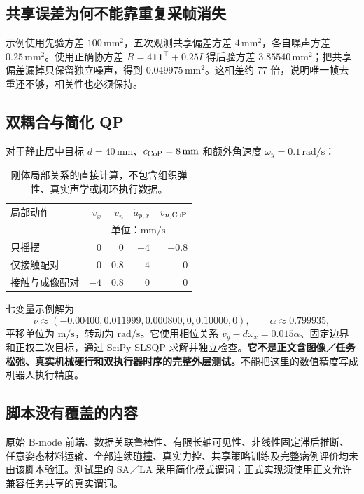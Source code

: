 \documentclass[UTF8,11pt,a4paper,fontset=fandol]{ctexart}
\numberwithin{equation}{section}
\theoremstyle{definition}
\begin{document}
\subsection{共享误差为何不能靠重复采帧消失}
示例使用先验方差 $100\,\mathrm{mm^2}$，五次观测共享偏差方差 $4\,\mathrm{mm^2}$，各自噪声方差 $0.25\,\mathrm{mm^2}$。使用正确协方差 $R=4\mathbf1\mathbf1^\top+0.25I$ 得后验方差 $3.85540\,\mathrm{mm^2}$；把共享偏差漏掉只保留独立噪声，得到 $0.049975\,\mathrm{mm^2}$。这相差约 77 倍，说明唯一帧去重还不够，相关性也必须保持。

\subsection{双耦合与简化 QP}
对于静止居中目标 $d=40\,\mathrm{mm}$、$c_{\rm CoP}=8\,\mathrm{mm}$ 和额外角速度 $\omega_y=0.1\,\mathrm{rad/s}$：
\begin{table}[htbp]\centering\small
\begin{tabular}{lrrrr}
\toprule
局部动作 & $v_x$ & $v_n$ & $\dot a_{p,x}$ & $v_{n,\rm CoP}$\\
 & \multicolumn{4}{c}{单位：$\mathrm{mm/s}$}\\\midrule
只摇摆 & 0 & 0 & $-4$ & $-0.8$\\
仅接触配对 & 0 & $0.8$ & $-4$ & 0\\
接触与成像配对 & $-4$ & $0.8$ & 0 & 0\\\bottomrule
\end{tabular}
\caption{刚体局部关系的直接计算，不包含组织弹性、真实声学或闭环执行数据。}
\end{table}

七变量示例解为
\begin{equation}
\nu\approx(-0.00400,0.011999,0.000800,0,0.10000,0),\qquad
\alpha\approx0.799935,
\end{equation}
平移单位为 $\mathrm{m/s}$，转动为 $\mathrm{rad/s}$。它使用相位关系 $v_y-d\omega_x=0.015\alpha$、固定边界和正权二次目标，通过 SciPy SLSQP 求解并独立检查。\textbf{它不是正文含图像／任务松弛、真实机械硬行和双执行器时序的完整外层测试。}不能把这里的数值精度写成机器人执行精度。

\subsection{脚本没有覆盖的内容}
原始 B-mode 前端、数据关联鲁棒性、有限长轴可见性、非线性固定滞后推断、任意姿态材料运输、全部连续碰撞、真实力控、共享策略训练及完整病例评价均未由该脚本验证。测试里的 SA／LA 采用简化模式谓词；正式实现须使用正文允许兼容任务共享的真实谓词。
\end{document}
